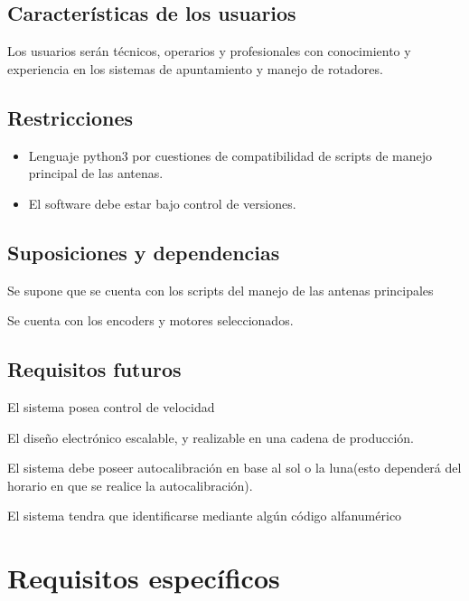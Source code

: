 \documentclass[12pt,a4paper, twosite]{article}
\begin{document}
	\subsection{Características de los usuarios}
	\label{sec:orga40b0ee}
	Los usuarios serán técnicos, operarios y profesionales con conocimiento y experiencia en los sistemas de apuntamiento y manejo de rotadores. 
	\subsection{Restricciones}
	\label{sec:org5ca5790}
	
	
	\begin{itemize}
		
		\item Lenguaje python3 por cuestiones de compatibilidad de scripts de manejo principal de las antenas.
		\item El software debe estar bajo control de versiones.  
	\end{itemize}
	
	
	\subsection{Suposiciones y dependencias}
	\label{sec:org0ae23fe}
	Se supone que se cuenta con los scripts del manejo de las antenas principales 
	
	Se cuenta con los encoders y motores seleccionados. 
	
	
	\subsection{Requisitos futuros}
	\label{sec:org33cfcdb}
	El sistema posea control de velocidad 
	
	El diseño electrónico escalable, y realizable en una cadena de producción.  
	
	El sistema debe poseer autocalibración en base al sol o la luna(esto dependerá del horario en que se realice la autocalibración).  
	
	El sistema tendra que identificarse mediante algún código alfanumérico
	
	
	\section{Requisitos específicos}
	\label{sec:org40573d1}
	
\end{document}
